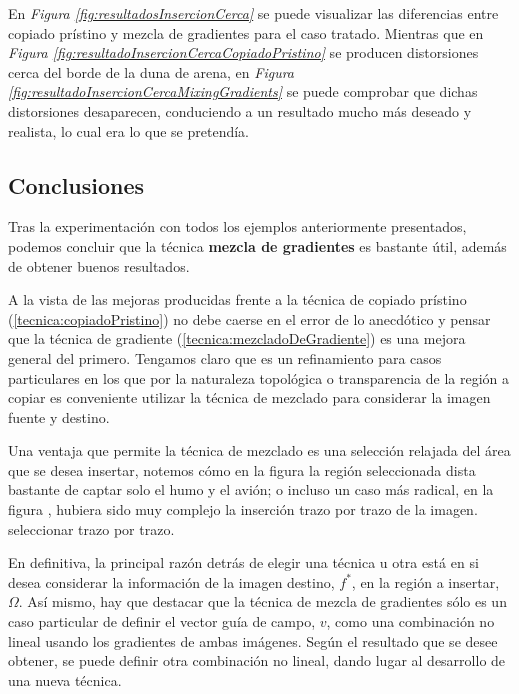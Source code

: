 \documentclass[11pt,twoside,titlepage,a4paper]{article}
\numberwithin{equation}{section} %
\theoremstyle{usual}
\begin{document}
En \textit{Figura \ref{fig:resultadosInsercionCerca}} se puede visualizar las diferencias entre copiado prístino y mezcla de gradientes para el caso tratado. Mientras que en \textit{Figura \ref{fig:resultadoInsercionCercaCopiadoPristino}} se producen distorsiones cerca del borde de la duna de arena, en \textit{Figura \ref{fig:resultadoInsercionCercaMixingGradients}} se puede comprobar que dichas distorsiones desaparecen, conduciendo a un resultado mucho más deseado y realista, lo cual era lo que se pretendía.

\subsection{Conclusiones}

Tras la experimentación con todos los ejemplos anteriormente presentados, podemos concluir que la técnica \textbf{mezcla de gradientes} es bastante útil, además de obtener buenos resultados.

A la vista de las mejoras producidas frente a la técnica de copiado prístino (\ref{tecnica:copiadoPristino}) no debe caerse en el error de lo anecdótico y pensar que la técnica de gradiente (\ref{tecnica:mezcladoDeGradiente}) es una mejora general del primero.  Tengamos claro que es un refinamiento para casos particulares en los que por la naturaleza topológica o transparencia de la región a copiar es conveniente utilizar la técnica de mezclado para considerar la imagen fuente y destino.  

Una ventaja que permite la técnica de mezclado es una selección relajada del área que se desea insertar, notemos cómo en la   figura \label{fig:imagenesUsadasInsercionCerca} la región seleccionada dista bastante de captar solo el humo y el avión; o incluso un caso más radical, en la figura \label{fig:imagenesUsadasInsercionAgujeros}, hubiera sido muy complejo la inserción trazo por trazo de la imagen. seleccionar trazo por trazo. 

En definitiva, la principal razón detrás de elegir una técnica u otra está en si desea considerar la información de la imagen destino, $f^*$, en la región a insertar, $\Omega$. Así mismo, hay que destacar que la técnica de mezcla de gradientes sólo es un caso particular de definir el vector guía de campo, $v$, como una combinación no lineal usando los gradientes de ambas imágenes. Según el resultado que se desee obtener, se puede definir otra combinación no lineal, dando lugar al desarrollo de una nueva técnica.

\newpage
\end{document}
